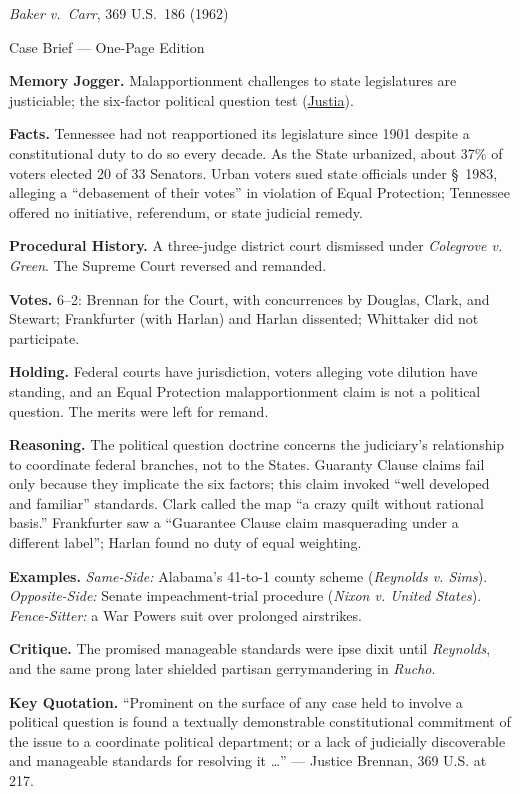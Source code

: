\documentclass[12pt]{article}
\begin{document}
\begin{center}
{\Large \textit{Baker v.\ Carr}, 369 U.S.\ 186 (1962)\par}
\vspace{0.3em}
{\normalsize Case Brief --- One-Page Edition\par}
\end{center}

\textbf{Memory Jogger.} Malapportionment challenges to state legislatures are justiciable; the six-factor political question test (\href{https://supreme.justia.com/cases/federal/us/369/186/}{Justia}).

\textbf{Facts.} Tennessee had not reapportioned its legislature since 1901 despite a constitutional duty to do so every decade. As the State urbanized, about 37\% of voters elected 20 of 33 Senators. Urban voters sued state officials under \S~1983, alleging a ``debasement of their votes'' in violation of Equal Protection; Tennessee offered no initiative, referendum, or state judicial remedy.

\textbf{Procedural History.} A three-judge district court dismissed under \textit{Colegrove v. Green}. The Supreme Court reversed and remanded.

\textbf{Votes.} 6--2: Brennan for the Court, with concurrences by Douglas, Clark, and Stewart; Frankfurter (with Harlan) and Harlan dissented; Whittaker did not participate.

\textbf{Holding.} Federal courts have jurisdiction, voters alleging vote dilution have standing, and an Equal Protection malapportionment claim is not a political question. The merits were left for remand.

\textbf{Reasoning.} The political question doctrine concerns the judiciary's relationship to coordinate federal branches, not to the States. Guaranty Clause claims fail only because they implicate the six factors; this claim invoked ``well developed and familiar'' standards. Clark called the map ``a crazy quilt without rational basis.'' Frankfurter saw a ``Guarantee Clause claim masquerading under a different label''; Harlan found no duty of equal weighting.

\textbf{Examples.} \emph{Same-Side:} Alabama's 41-to-1 county scheme (\textit{Reynolds v. Sims}). \emph{Opposite-Side:} Senate impeachment-trial procedure (\textit{Nixon v. United States}). \emph{Fence-Sitter:} a War Powers suit over prolonged airstrikes.

\textbf{Critique.} The promised manageable standards were ipse dixit until \textit{Reynolds}, and the same prong later shielded partisan gerrymandering in \textit{Rucho}.

\textbf{Key Quotation.} ``Prominent on the surface of any case held to involve a political question is found a textually demonstrable constitutional commitment of the issue to a coordinate political department; or a lack of judicially discoverable and manageable standards for resolving it \ldots'' --- Justice Brennan, 369 U.S. at 217.
\end{document}
